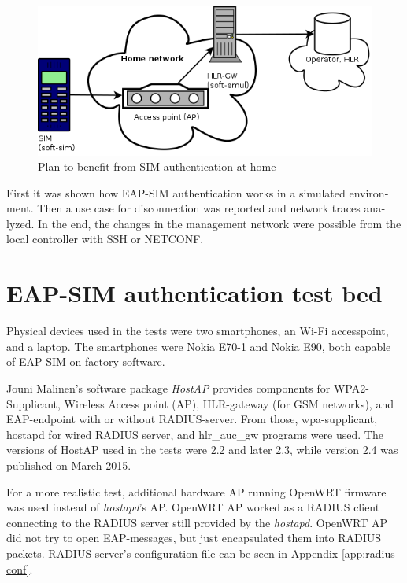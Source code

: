 \documentclass[12pt,a4paper,english]{tutthesis}
\begin{document}
\begin{otherlanguage}{english}
\begin{figure}[htb]
\centering
\includegraphics[width=.9\linewidth]{phone-soft-hlr.png}
\caption{\label{fig:sim-pre}Plan to benefit from SIM-authentication at home}
\end{figure}

First it was shown how EAP-SIM authentication works in a simulated
environment.
 Then a use case for disconnection was reported and network traces analyzed.
In the end, the changes in the management network were possible from the local controller with  SSH or NETCONF.



\section{EAP-SIM authentication test bed}
\label{sec-5-1}



Physical devices used in the tests  were two smartphones, an Wi-Fi accesspoint, and a laptop.
The smartphones were Nokia E70-1 and Nokia E90, both capable of
EAP-SIM on factory software.

Jouni Malinen's software package \emph{HostAP}\cite{hostapd} provides
components for WPA2-Supplicant, Wireless Access point (AP),
HLR-gateway (for GSM networks), and EAP-endpoint with or without
RADIUS-server. From those, wpa-supplicant, hostapd for wired RADIUS
server, and hlr\_auc\_gw programs were used.  
The versions of HostAP used in the tests were 2.2 and later 2.3,
while version 2.4 was published on March 2015.


For a more realistic test, additional hardware AP running OpenWRT
firmware was used instead of \emph{hostapd}'s AP. OpenWRT AP worked as a
RADIUS client connecting to the RADIUS server still provided by the
\emph{hostapd}.  OpenWRT AP did not try to open EAP-messages, but just
encapsulated them into RADIUS packets.  RADIUS server's configuration
file can be seen in Appendix \ref{app:radius-conf}.



\end{otherlanguage}
\end{document}
